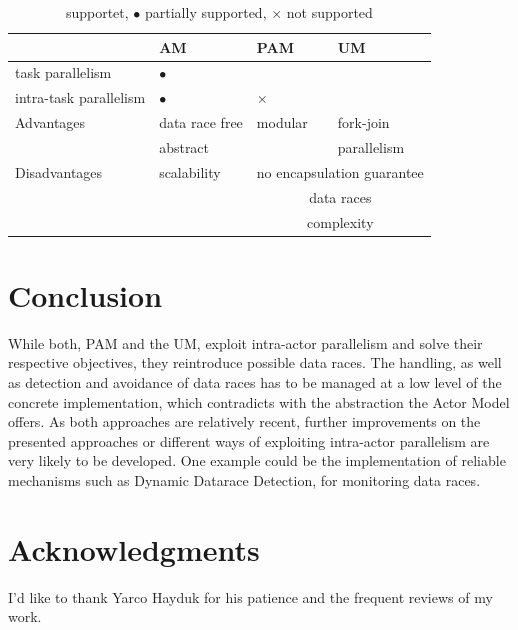\documentclass[11pt, journal]{IEEEtran}
\newcommand{\X}{$\times$ }
\newcommand{\Bull}{$\bullet$ }
\begin{document}
\begin{table}[!htbp]
	\centering
	 \label{tab:comparison}
	
	\begin{tabularx}{\columnwidth}{ p{} *{3}{X}}
		\toprule
		& \bf{AM} & \bf{PAM} & \bf{UM} \\
		\hline
		task parallelism 	& \Bull	& \checkmark & \checkmark \\
		intra-task parallelism & \Bull & \X & \checkmark \\
		\hline
		Advantages & data race free & modular & fork-join\\
		& abstract & & parallelism\\
		\hline
		Disadvantages & scalability & \multicolumn{2}{c}{no encapsulation guarantee}\\
		& & \multicolumn{2}{c}{data races}\\
		& & \multicolumn{2}{c}{complexity}\\
		\bottomrule
	\end{tabularx}\bigskip
	\caption*{\centering \checkmark supportet, \Bull partially supported, \X not supported}
\end{table}

\section{Conclusion}\label{sec:conclusion}
While both, PAM and the UM, exploit intra-actor parallelism and solve their respective objectives, they reintroduce possible data races. The handling, as well as detection and avoidance of data races has to be managed at a low level of the concrete implementation, which contradicts with the abstraction the Actor Model offers. As both approaches are relatively recent, further improvements on the presented approaches or different ways of exploiting intra-actor parallelism are very likely to be developed. One example could be the implementation of reliable mechanisms such as Dynamic Datarace Detection, for monitoring data races.

\section*{Acknowledgments}
I'd like to thank Yarco Hayduk for his patience and the frequent reviews of my work.



\end{document}
